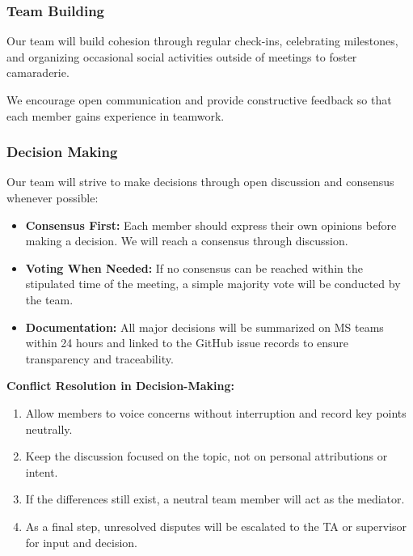\documentclass{article}
\begin{document}
\subsubsection*{Team Building}

Our team will build cohesion through regular check-ins, 
celebrating milestones, and organizing occasional social 
activities outside of meetings to foster camaraderie.

We encourage open communication and provide constructive feedback so that 
each member gains experience in teamwork.

\subsubsection*{Decision Making} 


Our team will strive to make decisions through open discussion and consensus whenever possible:

\begin{itemize}
  \item \textbf{Consensus First:} Each member should express their own opinions before making a decision. We will reach a consensus through discussion.
  \item \textbf{Voting When Needed:} If no consensus can be reached within the stipulated time of the meeting, a simple majority vote will be conducted by the team.
  \item \textbf{Documentation:} All major decisions will be summarized on MS teams within 24 hours and linked to the GitHub issue records to ensure transparency and traceability.
\end{itemize}

\textbf{Conflict Resolution in Decision-Making:}
\begin{enumerate}
  \item Allow members to voice concerns without interruption and record key points neutrally.
  \item Keep the discussion focused on the topic, not on personal attributions or intent.
  \item If the differences still exist, a neutral team member will act as the mediator.
  \item As a final step, unresolved disputes will be escalated to the TA or supervisor for input and decision.
\end{enumerate}
\end{document}
